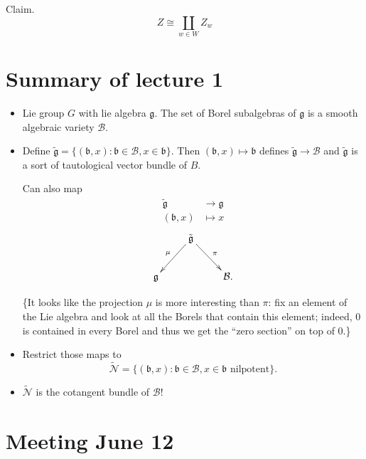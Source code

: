 \medskip\noindent
Claim.
$$
Z \cong \coprod_{w \in W}Z_w
$$


\section{Summary of lecture 1}
\label{section-summary-1}

\begin{itemize}
\item Lie group $G$ with lie algebra
$\mathfrak{g}$. The set of Borel subalgebras
of $\mathfrak{g}$ is a smooth algebraic
variety $\mathcal{B}$.

\item Define $\tilde{\mathfrak{g}}=
\{(\mathfrak{b},x):\mathfrak{b} \in
\mathcal{B}, x \in \mathfrak{b}\}$.
Then $(\mathfrak{b},x) \mapsto  \mathfrak{b}$
defines $\tilde{\mathfrak{g}}\to \mathcal{B}$
and $\tilde{\mathfrak{g}}$ is a sort of
tautological vector bundle of $B$.

Can also map
$$
\begin{aligned}\tilde{\mathfrak{g}}
&\longrightarrow \mathfrak{g} \\
(\mathfrak{b},x) &\longmapsto x
\end{aligned}
$$
$$
\xymatrix{
&\tilde{\mathfrak{g}}\ar[dl]_{\mu}\ar[dr]
^{\pi}\\
\mathfrak{g}&&\mathcal{B}.
}
$$

\medskip\noindent
\{It looks like the projection $\mu$
is more interesting than $\pi$: fix an
element of the Lie algebra and look at all
the Borels that contain this element; indeed,
0 is contained in every Borel and thus we get
the ``zero section'' on top of 0.\}

\item Restrict those maps to
$$
\tilde{\mathcal{N}}=\{(\mathfrak{b},x):
\mathfrak{b}
\in \mathcal{B},
x \in \mathfrak{b}\text{ nilpotent}\}.
$$

\item $\tilde{\mathcal{N}}$ is the cotangent
bundle of $\mathcal{B}$!
\end{itemize}

\section{Meeting June 12}
\label{section-june-12}

